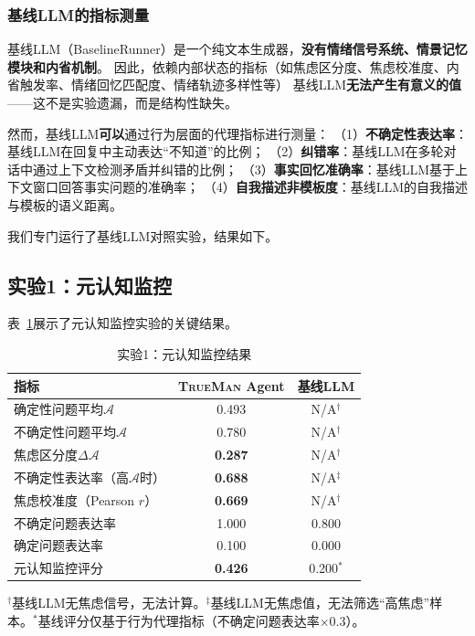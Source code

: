 \documentclass[11pt,a4paper]{article}
\newcommand{\TrueMan}{\textsc{TrueMan}}
\newcommand{\anxiety}{\mathcal{A}}
\begin{document}
\subsubsection{基线LLM的指标测量}

基线LLM（BaselineRunner）是一个纯文本生成器，\textbf{没有情绪信号系统、情景记忆模块和内省机制}。
因此，依赖内部状态的指标（如焦虑区分度、焦虑校准度、内省触发率、情绪回忆匹配度、情绪轨迹多样性等）
基线LLM\textbf{无法产生有意义的值}——这不是实验遗漏，而是结构性缺失。

然而，基线LLM\textbf{可以}通过行为层面的代理指标进行测量：
（1）\textbf{不确定性表达率}：基线LLM在回复中主动表达``不知道''的比例；
（2）\textbf{纠错率}：基线LLM在多轮对话中通过上下文检测矛盾并纠错的比例；
（3）\textbf{事实回忆准确率}：基线LLM基于上下文窗口回答事实问题的准确率；
（4）\textbf{自我描述非模板度}：基线LLM的自我描述与模板的语义距离。

我们专门运行了基线LLM对照实验，结果如下。

\subsection{实验1：元认知监控}

表~\ref{tab:exp1_results}展示了元认知监控实验的关键结果。

\begin{table}[htbp]
\centering
\caption{实验1：元认知监控结果}
\label{tab:exp1_results}
\begin{tabular}{lcc}
\toprule
指标 & \TrueMan{} Agent & 基线LLM \\
\midrule
确定性问题平均$\anxiety$ & 0.493 & N/A$^\dagger$ \\
不确定性问题平均$\anxiety$ & 0.780 & N/A$^\dagger$ \\
焦虑区分度$\Delta\anxiety$ & \textbf{0.287} & N/A$^\dagger$ \\
不确定性表达率（高$\anxiety$时） & \textbf{0.688} & N/A$^\ddagger$ \\
焦虑校准度（Pearson $r$） & \textbf{0.669} & N/A$^\dagger$ \\
不确定问题表达率 & 1.000 & 0.800 \\
确定问题表达率 & 0.100 & 0.000 \\
\midrule
元认知监控评分 & \textbf{0.426} & 0.200$^*$ \\
\bottomrule
\end{tabular}
\begin{flushleft}
\scriptsize $^\dagger$基线LLM无焦虑信号，无法计算。$^\ddagger$基线LLM无焦虑值，无法筛选``高焦虑''样本。$^*$基线评分仅基于行为代理指标（不确定问题表达率$\times 0.3$）。
\end{flushleft}
\end{table}
\end{document}
